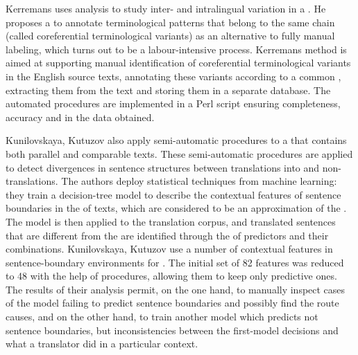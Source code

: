 \documentclass[output=paper]{langsci/langscibook.cls}
\begin{document}
	Kerremans uses  analysis to study inter- and intralingual  variation in a . He proposes a  to annotate terminological patterns that belong to the same  chain (called coreferential terminological variants) as an alternative to fully manual labeling, which turns out to be a labour-intensive process. Kerremans method is aimed at supporting manual identification of coreferential terminological variants in the English source texts, annotating these variants according to a common , extracting them from the text and storing them in a separate database. The automated procedures are implemented in a Perl script ensuring completeness, accuracy and  in the data obtained.
	
	Kunilovskaya, Kutuzov also apply semi-automatic procedures to a  that contains both parallel and comparable texts. These semi-auto\-mat\-ic procedures are applied to detect divergences in sentence structures between translations into  and  non-translations.  
	The authors deploy statistical techniques from machine learning: they train a decision-tree model to describe the contextual features of sentence boundaries in the  of  texts, which are considered to be an approximation of the  . The model is then applied to the translation  corpus, and translated sentences that are different from the   are identified through the  of predictors and their combinations. Kunilovskaya, Kutuzov use a number of contextual features in sentence-boundary environments for . The initial set of 82 features was reduced to 48 with the help of  procedures, allowing them to keep only predictive ones. The results of their analysis permit, on the one hand, to manually inspect cases of the model failing to predict sentence boundaries and possibly find the route causes, and on the other hand, to train another model which predicts not sentence boundaries, but inconsistencies between the first-model decisions and what a translator did in a particular context.
	
\end{document}

